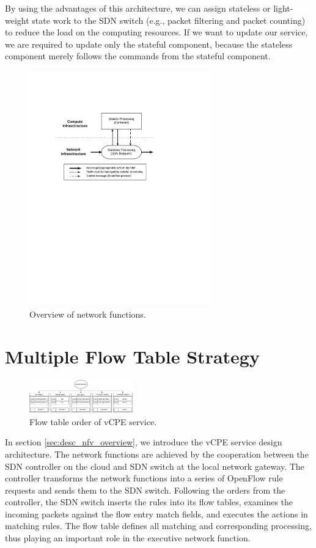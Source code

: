By using the advantages of this architecture, we can assign stateless or light-weight state work to the SDN switch (e.g., packet filtering and packet counting) to reduce the load on the computing resources.
If we want to update our service, we are required to update only the stateful component, because the stateless component merely follows the commands from the stateful component.
\begin{figure}[!t]
\centering
\includegraphics[width=0.7\textwidth]{./fig/nfv_overview}
\caption{Overview of network functions.}
\label{fig:nfv_overview}
\end{figure}


\section{Multiple Flow Table Strategy} \label{sec:multi_flow_table_strategy}

\begin{figure}
\centering
\includegraphics[width=0.4\textwidth]{./fig/mft_table_overview}
\caption{Flow table order of vCPE service.}
\label{fig:mft_table_overview}
\end{figure}

In section \ref{sec:desc_nfv_overview}, we introduce the vCPE service design architecture.
The network functions are achieved by the cooperation between the SDN controller on the cloud and SDN switch at the local network gateway.
The controller transforms the network functions into a series of OpenFlow rule requests and sends them to the SDN switch.
Following the orders from the controller, the SDN switch inserts the rules into its flow tables, examines the incoming packets against the flow entry match fields, and executes the actions in matching rules.
The flow table \cite{sdn-ft} defines all matching and corresponding processing, thus playing an important role in the executive network function.

